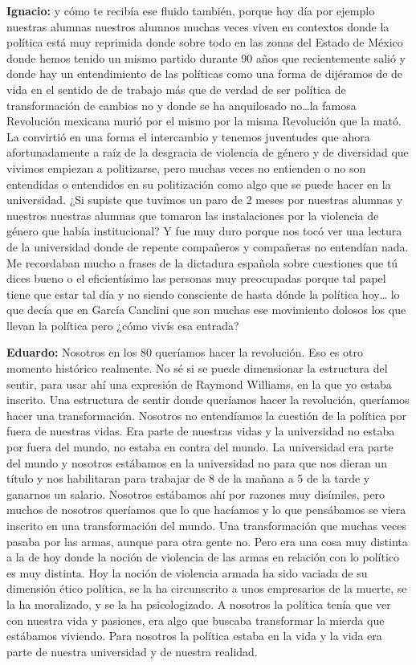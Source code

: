 \documentclass[
]{interact}
\begin{document}
\textbf{Ignacio:} y cómo te recibía ese fluido también, porque hoy día
por ejemplo nuestras alumnas nuestros alumnos muchas veces viven en
contextos donde la política está muy reprimida donde sobre todo en las
zonas del Estado de México donde hemos tenido un mismo partido durante
90 años que recientemente salió y donde hay un entendimiento de las
políticas como una forma de dijéramos de de vida en el sentido de de
trabajo más que de verdad de ser política de transformación de cambios
no y donde se ha anquilosado no\ldots la famosa Revolución mexicana
murió por el mismo por la misma Revolución que la mató. La convirtió en
una forma el intercambio y tenemos juventudes que ahora afortunadamente
a raíz de la desgracia de violencia de género y de diversidad que
vivimos empiezan a politizarse, pero muchas veces no entienden o no son
entendidas o entendidos en su politización como algo que se puede hacer
en la universidad. ¿Si supiste que tuvimos un paro de 2 meses por
nuestras alumnas y nuestros nuestras alumnas que tomaron las
instalaciones por la violencia de género que había institucional? Y fue
muy duro porque nos tocó ver una lectura de la universidad donde de
repente compañeros y compañeras no entendían nada. Me recordaban mucho a
frases de la dictadura española sobre cuestiones que tú dices bueno o el
eficientísimo las personas muy preocupadas porque tal papel tiene que
estar tal día y no siendo consciente de hasta dónde la política
hoy\ldots{} lo que decía que en García Canclini que son muchas ese
movimiento dolosos los que llevan la política pero ¿cómo vivís esa
entrada?

\textbf{Eduardo:} Nosotros en los 80 queríamos hacer la revolución. Eso
es otro momento histórico realmente. No sé si se puede dimensionar la
estructura del sentir, para usar ahí una expresión de Raymond Williams,
en la que yo estaba inscrito. Una estructura de sentir donde queríamos
hacer la revolución, queríamos hacer una transformación. Nosotros no
entendíamos la cuestión de la política por fuera de nuestras vidas. Era
parte de nuestras vidas y la universidad no estaba por fuera del mundo,
no estaba en contra del mundo. La universidad era parte del mundo y
nosotros estábamos en la universidad no para que nos dieran un título y
nos habilitaran para trabajar de 8 de la mañana a 5 de la tarde y
ganarnos un salario. Nosotros estábamos ahí por razones muy disímiles,
pero muchos de nosotros queríamos que lo que hacíamos y lo que
pensábamos se viera inscrito en una transformación del mundo. Una
transformación que muchas veces pasaba por las armas, aunque para otra
gente no. Pero era una cosa muy distinta a la de hoy donde la noción de
violencia de las armas en relación con lo político es muy distinta. Hoy
la noción de violencia armada ha sido vaciada de su dimensión ético
política, se la ha circunscrito a unos empresarios de la muerte, se la
ha moralizado, y se la ha psicologizado. A nosotros la política tenía
que ver con nuestra vida y pasiones, era algo que buscaba transformar la
mierda que estábamos viviendo. Para nosotros la política estaba en la
vida y la vida era parte de nuestra universidad y de nuestra realidad.
\end{document}
